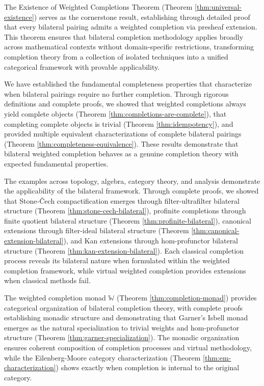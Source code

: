 \documentclass[11pt]{article}
\theoremstyle{plain}
\theoremstyle{definition}
\theoremstyle{remark}
\begin{document}
The Existence of Weighted Completions Theorem (Theorem \ref{thm:universal-existence}) serves as the cornerstone result, establishing through detailed proof that every bilateral pairing admits a weighted completion via presheaf extension. This theorem ensures that bilateral completion methodology applies broadly across mathematical contexts without domain-specific restrictions, transforming completion theory from a collection of isolated techniques into a unified categorical framework with provable applicability.

We have established the fundamental completeness properties that characterize when bilateral pairings require no further completion. Through rigorous definitions and complete proofs, we showed that weighted completions always yield complete objects (Theorem \ref{thm:completions-are-complete}), that completing complete objects is trivial (Theorem \ref{thm:idempotency}), and provided multiple equivalent characterizations of complete bilateral pairings (Theorem \ref{thm:completeness-equivalence}). These results demonstrate that bilateral weighted completion behaves as a genuine completion theory with expected fundamental properties.

The examples across topology, algebra, category theory, and analysis demonstrate the applicability of the bilateral framework. Through complete proofs, we showed that Stone-\v{C}ech compactification emerges through filter-ultrafilter bilateral structure (Theorem \ref{thm:stone-cech-bilateral}), profinite completions through finite quotient bilateral structure (Theorem \ref{thm:profinite-bilateral}), canonical extensions through filter-ideal bilateral structure (Theorem \ref{thm:canonical-extension-bilateral}), and Kan extensions through hom-profunctor bilateral structure (Theorem \ref{thm:kan-extension-bilateral}). Each classical completion process reveals its bilateral nature when formulated within the weighted completion framework, while virtual weighted completion provides extensions when classical methods fail.

The weighted completion monad $\mathbb{W}$ (Theorem \ref{thm:completion-monad}) provides categorical organization of bilateral completion theory, with complete proofs establishing monadic structure and demonstrating that Garner's Isbell monad emerges as the natural specialization to trivial weights and hom-profunctor structure (Theorem \ref{thm:garner-specialization}). The monadic organization ensures coherent composition of completion processes and virtual methodology, while the Eilenberg-Moore category characterization (Theorem \ref{thm:em-characterization}) shows exactly when completion is internal to the original category.
\end{document}
